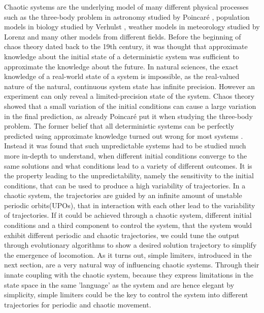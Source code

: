 \documentclass[main]{subfiles}
\begin{document}
Chaotic systems are the underlying model of many different physical processes such as the three-body problem in astronomy studied by Poincaré \cite{bib:Poincare1892}, population models in biology studied by Verhulst \cite{bib:Verhulst1838}, weather models in meteorology studied by Lorenz \cite{bib:Lorenz1963} and many other models from different fields. %
%
Before the beginning of chaos theory dated back to the 19th century, it was thought that approximate knowledge about the initial state of a deterministic system was sufficient to approximate the knowledge about the future. In natural sciences, the exact knowledge of a real-world state of a system is impossible, as the real-valued nature of the natural, continuous system state has infinite precision. %
%
However an experiment can only reveal a limited-precision state of the system. %
%
Chaos theory showed that a small variation of the initial conditions can cause a large variation in the final prediction, as already Poincaré put it when studying the three-body problem. %
%
The former belief that all deterministic systems can be perfectly predicted using approximate knowledge turned out wrong for most systems \cite{bib:Motter2013}. %
%
Instead it was found that such unpredictable systems had to be studied much more in-depth to understand, when different initial conditions converge to the same solutions and what conditions lead to a variety of different outcomes. %
%
It is the property leading to the unpredictability, namely the sensitivity to the initial conditions, that can be used to produce a high variability of trajectories. %
%
In a chaotic system, the trajectories are guided by an infinite amount of unstable periodic orbits(UPOs), that in interaction with each other lead to the variability of trajectories. %
%
If it could be achieved through a chaotic system, different initial conditions and a third component to control the system, that the system would exhibit different periodic and chaotic trajectories, we could tune the output through evolutionary algorithms to show a desired solution trajectory to simplify the emergence of locomotion. %
%
As it turns out, simple limiters, introduced in the next section, are a very natural way of influencing chaotic systems. %
%
Through their innate coupling with the chaotic system, because they express limitations in the state space in the same 'language' as the system and are hence elegant by simplicity, simple limiters could be the key to control the system into different trajectories for periodic and chaotic movement.
\end{document}
